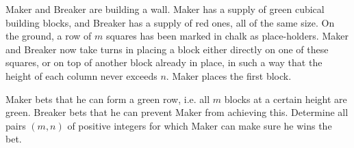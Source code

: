 Maker and Breaker are building a wall. Maker has a supply of green cubical building blocks, and Breaker has a supply of red ones, all of the same size. On the ground, a row of $m$ squares has been marked in chalk as place-holders. Maker and Breaker now take turns in placing a block either directly on one of these squares, or on top of another block already in place, in such a way that the height of each column never exceeds $n$. Maker places the first block.

Maker bets that he can form a green row, i.e. all $m$ blocks at a certain height are green. Breaker bets that he can prevent Maker from achieving this. Determine all pairs $(m,n)$ of positive integers for which Maker can make sure he wins the bet.